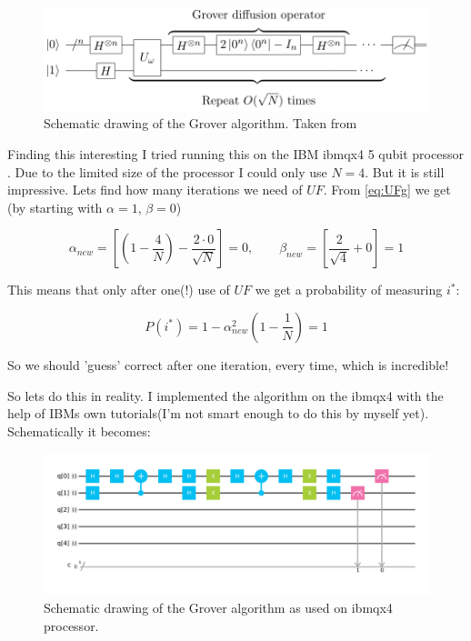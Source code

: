 \documentclass[a4paper,norsk, 10pt]{article}
\begin{document}
\begin{figure}[H]
\centering
\includegraphics[scale=0.5]{grover.png}
\caption{Schematic drawing of the Grover algorithm. Taken from \cite{wiki:grover}}
\end{figure}

Finding this interesting I tried running this on the IBM ibmqx4 5 qubit processor \cite{imbq}. Due to the limited size of the processor I could only use $N=4$. But it is still impressive. Lets find how many iterations we need of $UF$. From \eqref{eq:UFg} we get (by starting with $\alpha = 1$, $\beta = 0$)

\begin{equation}
\alpha_{new} = \left[\left(1 - \frac{4}{N}\right) - \frac{2\cdot 0}{\sqrt{N}}\right] = 0, \qquad \beta_{new} = \left[\frac{2}{\sqrt{4}} + 0\right] = 1
\end{equation}

This means that only after one(!) use of $UF$ we get a probability of measuring $i^*$:

\begin{equation}
P(i^*) = 1 - \alpha^2_{new}\left(1 - \frac{1}{N}\right) = 1
\end{equation}

So we should 'guess' correct after one iteration, every time, which is incredible!

So lets do this in reality. I implemented the algorithm on the ibmqx4 with the help of IBMs own tutorials\cite{video}(I'm not smart enough to do this by myself yet). Schematically it becomes:

\begin{figure}[H]
\centering
\includegraphics[scale=0.2]{groverIBM.png}
\caption{Schematic drawing of the Grover algorithm as used on ibmqx4 processor.}
\end{figure}
\end{document}
